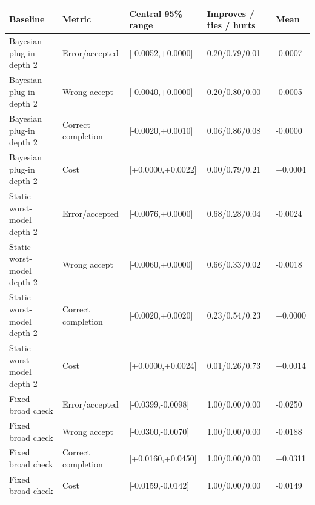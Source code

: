 \begin{tabular}{@{}lllll@{}}
\toprule
Baseline & Metric & Central 95\% range & Improves / ties / hurts & Mean\\
\midrule
Bayesian plug-in depth 2 & Error/accepted & [-0.0052,+0.0000] & 0.20/0.79/0.01 & -0.0007\\
Bayesian plug-in depth 2 & Wrong accept & [-0.0040,+0.0000] & 0.20/0.80/0.00 & -0.0005\\
Bayesian plug-in depth 2 & Correct completion & [-0.0020,+0.0010] & 0.06/0.86/0.08 & -0.0000\\
Bayesian plug-in depth 2 & Cost & [+0.0000,+0.0022] & 0.00/0.79/0.21 & +0.0004\\
Static worst-model depth 2 & Error/accepted & [-0.0076,+0.0000] & 0.68/0.28/0.04 & -0.0024\\
Static worst-model depth 2 & Wrong accept & [-0.0060,+0.0000] & 0.66/0.33/0.02 & -0.0018\\
Static worst-model depth 2 & Correct completion & [-0.0020,+0.0020] & 0.23/0.54/0.23 & +0.0000\\
Static worst-model depth 2 & Cost & [+0.0000,+0.0024] & 0.01/0.26/0.73 & +0.0014\\
Fixed broad check & Error/accepted & [-0.0399,-0.0098] & 1.00/0.00/0.00 & -0.0250\\
Fixed broad check & Wrong accept & [-0.0300,-0.0070] & 1.00/0.00/0.00 & -0.0188\\
Fixed broad check & Correct completion & [+0.0160,+0.0450] & 1.00/0.00/0.00 & +0.0311\\
Fixed broad check & Cost & [-0.0159,-0.0142] & 1.00/0.00/0.00 & -0.0149\\
\bottomrule
\end{tabular}
